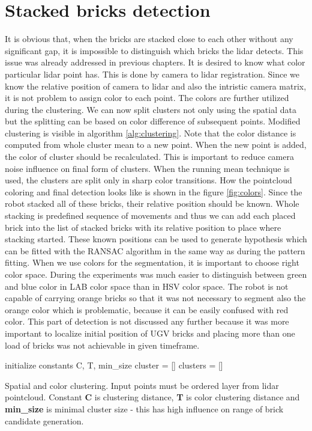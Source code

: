 \section{Stacked bricks detection}
It is obvious that, when the bricks are stacked close to each other without any significant gap, it is impossible to distinguish which bricks the lidar detects. This issue was already addressed in previous chapters. It is desired to know what color particular lidar point has. This is done by camera to lidar registration. Since we know the relative position of camera to lidar and also the intristic camera matrix, it is not problem to assign color to each point. The colors are further utilized during the clustering. We can now split clusters not only using the spatial data but the splitting can be based on color difference of subsequent points. Modified clustering is visible in algorithm \ref{alg:clustering}. Note that the color distance is computed from whole cluster mean to a new point. When the new point is added, the color of cluster should be recalculated. This is important to reduce camera noise influence on final form of clusters. When the running mean technique is used, the clusters are split only in sharp color transitions. How the pointcloud coloring and final detection looks like is shown in the figure  \ref{fig:colors}. Since the robot stacked all of these bricks, their relative position should be known. Whole stacking is predefined sequence of movements and thus we can add each placed brick into the list of stacked bricks with its relative position to place where stacking started. These known positions can be used to generate hypothesis which can be fitted with the RANSAC algorithm in the same way as during the pattern fitting. When we use colors for the segmentation, it is important to choose right color space. During the experiments was much easier to distinguish between green and blue color in LAB color space than in HSV color space. The robot is not capable of carrying orange bricks so that it was not necessary to segment also the orange color which is problematic, because it can be easily confused with red color. This part of detection is not discussed any further because it was more important to localize initial position of UGV bricks and placing more than one load of bricks was not achievable in given timeframe.

\begin{algorithm}[H]
	initialize constants C, T, min\_size \;
	cluster = []\;
	clusters = []\;
	\caption{Spatial and color clustering. Input points must be ordered layer from lidar pointcloud. Constant \textbf{C} is clustering distance, \textbf{T} is color clustering distance and \textbf{min\_size} is minimal cluster size - this has high influence on range of brick candidate generation.}
	\label{alg:clustering}
\end{algorithm}

